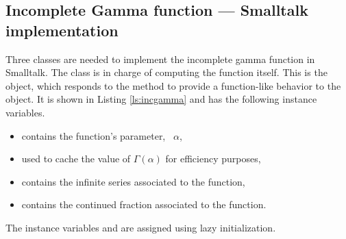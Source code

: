\subsection{Incomplete Gamma function --- Smalltalk  implementation}
\label{sec:sincgamma}
Three classes are needed to implement the incomplete gamma function in Smalltalk.
The class  is in charge of
computing the function itself. This is the object, which responds
to the method  to provide a function-like behavior to
the object. It is shown in Listing \ref{ls:incgamma} and has the
following instance variables.
\begin{itemize}
\item {} contains the function's parameter, \ie\ $\alpha$,
\item {} used to cache the value of $\Gamma\left(\alpha\right)$ for efficiency
purposes,
\item {} contains the infinite series associated to the function,
\item {} contains the continued fraction  associated to the
function.
\end{itemize}
The instance variables  and  are
assigned using lazy initialization.

